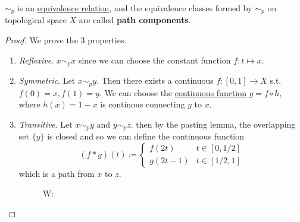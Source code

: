   \begin{lemma}
    \label{thm:path-components-are-equivalence-classes}
    $\sim_p$ is an \hyperref[st-def:equivalence_relation]{equivalence relation}, and the equivalence classes formed by $\sim_p$ on topological space $X$ are called \textbf{path components}.  
  \end{lemma}
  \begin{proof}
    We prove the 3 properties. 
    \begin{enumerate}
      \item \textit{Reflexive}. $x \sim_p x$ since we can choose the constant function $f: t \mapsto x$.  
      \item \textit{Symmetric}. Let $x \sim_p y$. Then there exists a continuous $f: [0, 1] \rightarrow X$ s.t. $f(0) = x, f(1) = y$. We can choose the \hyperref[def:continuous_func]{continuous function} $g = f \circ h$, where $h(x) = 1 - x$ is continous connecting $y$ to $x$. 
      \item \textit{Transitive}. Let $x \sim_p y$ and $y \sim_p z$. then by the pasting lemma, the overlapping set $\{y\}$ is closed and so we can define the continuous function 
      \begin{equation}
        (f \ast g)(t) \coloneqq \begin{cases} 
          f(2t) & t \in [0, 1/2] \\
          g(2t - 1) & t \in [1/2, 1] 
        \end{cases} 
      \end{equation}
      which is a path from $x$ to $z$. 

      \begin{figure}[H]
        \centering 
        \caption{W:}
      \end{figure}
    \end{enumerate}
  \end{proof}

